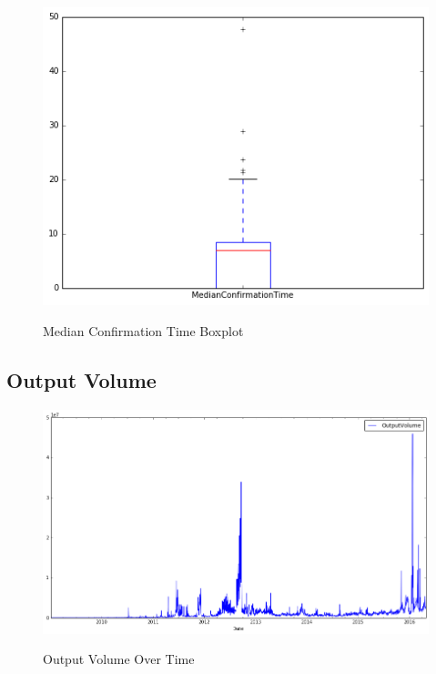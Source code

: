 \begin{figure}[bth]
  \myfloatalign
  {\includegraphics[width=1\linewidth]
    {gfx/median-confirmation-time-boxplot}}
  \caption{Median Confirmation Time Boxplot}
  \label{fig:median-confirmation-time-boxplot}
\end{figure}

\clearpage

\subsection{Output Volume}
\label{sec:output-volume}

\begin{figure}[bth]
  \myfloatalign
  {\includegraphics[width=1\linewidth]
    {gfx/output-volume-over-time}}
  \caption{Output Volume
    Over Time}
  \label{fig:output-volume-over-time}
\end{figure}

